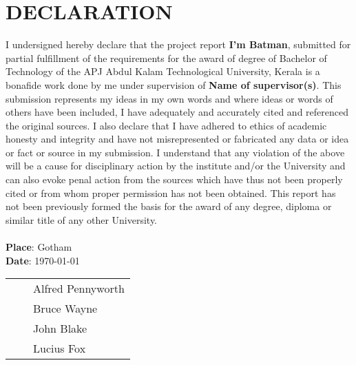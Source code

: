 \section*{\centering DECLARATION}

    I undersigned hereby declare that the project report \textbf{I'm Batman}, submitted for partial fulfillment of the requirements for the award of degree of Bachelor of Technology of the APJ Abdul Kalam Technological University, Kerala is a bonafide work done by me under supervision of \textbf{Name of supervisor(s)}. This submission represents my ideas in my own words and where ideas or words of others have been included, I have adequately and accurately cited and referenced the original sources. I also declare that I have adhered to ethics of academic honesty and integrity and have not misrepresented or fabricated any data or idea or fact or source in my submission. I understand that any violation of the above will be a cause for disciplinary action by the institute and/or the University and can also evoke penal action from the sources which have thus not been properly cited or from whom proper permission has not been obtained. This report has not been previously formed the basis for the award of any degree, diploma or similar title of any other University. \\ \\
\textbf{Place}: Gotham \\
\textbf{Date}: \today          \\ 
\begin{tabular}{ p{6cm} p{5cm} p{6cm} } 

                                    &&  Alfred Pennyworth \\ 
                                    &&  Bruce Wayne \\
                                    &&  John Blake \\
                                    &&  Lucius Fox \\
\end{tabular}

\newpage